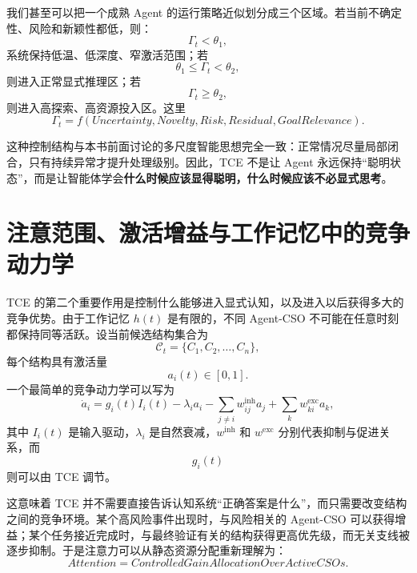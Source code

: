 我们甚至可以把一个成熟 Agent 的运行策略近似划分成三个区域。若当前不确定性、风险和新颖性都低，则：
\begin{equation}
    \Gamma_t<\theta_1,
\end{equation}
系统保持低温、低深度、窄激活范围；若
\begin{equation}
    \theta_1\le \Gamma_t<\theta_2,
\end{equation}
则进入正常显式推理区；若
\begin{equation}
    \Gamma_t\ge \theta_2,
\end{equation}
则进入高探索、高资源投入区。这里
\begin{equation}
    \Gamma_t
    =
    f(
    Uncertainty,
    Novelty,
    Risk,
    Residual,
    GoalRelevance
    ).
\end{equation}

这种控制结构与本书前面讨论的多尺度智能思想完全一致：正常情况尽量局部闭合，只有持续异常才提升处理级别。因此，TCE 不是让 Agent 永远保持“聪明状态”，而是让智能体学会\textbf{什么时候应该显得聪明，什么时候应该不必显式思考}。

\section{注意范围、激活增益与工作记忆中的竞争动力学}

TCE 的第二个重要作用是控制什么能够进入显式认知，以及进入以后获得多大的竞争优势。由于工作记忆 $h(t)$ 是有限的，不同 Agent-CSO 不可能在任意时刻都保持同等活跃。设当前候选结构集合为
\begin{equation}
    \mathcal C_t
    =
    \{C_1,C_2,\ldots,C_n\},
\end{equation}
每个结构具有激活量
\begin{equation}
    a_i(t)\in[0,1].
\end{equation}
一个最简单的竞争动力学可以写为
\begin{equation}
    \dot a_i
    =
    g_i(t)
    I_i(t)
    -
    \lambda_i a_i
    -
    \sum_{j\ne i}
    w_{ij}^{\mathrm{inh}}a_j
    +
    \sum_{k}
    w_{ki}^{\mathrm{exc}}a_k,
\end{equation}
其中 $I_i(t)$ 是输入驱动，$\lambda_i$ 是自然衰减，$w^{\mathrm{inh}}$ 和 $w^{\mathrm{exc}}$ 分别代表抑制与促进关系，而
\begin{equation}
    g_i(t)
\end{equation}
则可以由 TCE 调节。

这意味着 TCE 并不需要直接告诉认知系统“正确答案是什么”，而只需要改变结构之间的竞争环境。某个高风险事件出现时，与风险相关的 Agent-CSO 可以获得增益；某个任务接近完成时，与最终验证有关的结构获得更高优先级，而无关支线被逐步抑制。于是注意力可以从静态资源分配重新理解为：
\begin{equation}
    \boxed{
    Attention
    =
    ControlledGainAllocationOverActiveCSOs.
    }
\end{equation}

